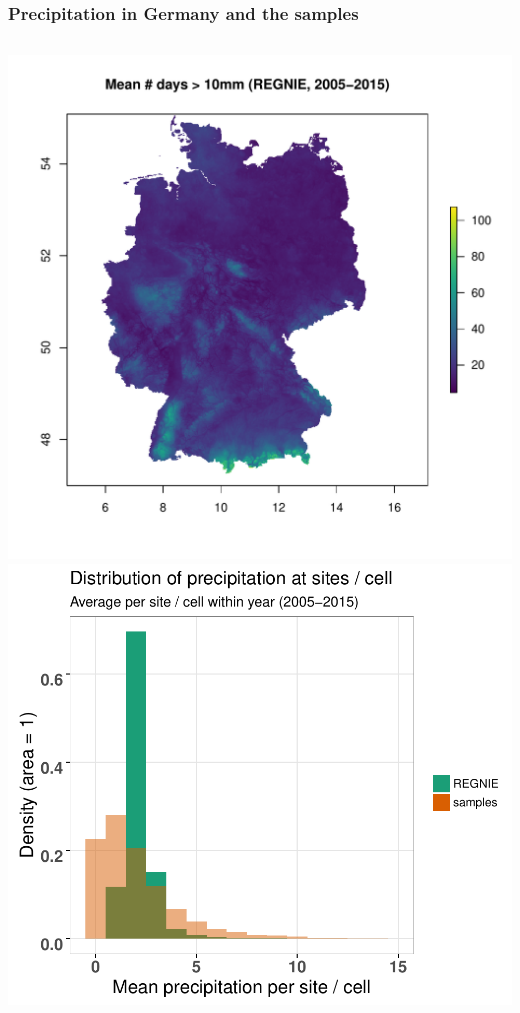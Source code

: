 \documentclass[
	10pt
	]{beamer}
\begin{document}
\begin{frame}
\frametitle{Precipitation in Germany and the samples}
	\begin{columns}
	    	\includegraphics[width=1.1\textwidth, keepaspectratio]{figs/precip_map.pdf}
	    	    	\includegraphics[width=1.1\textwidth, keepaspectratio]{figs/precip_comp.pdf}
	\end{columns}
\end{frame}
\end{document}
